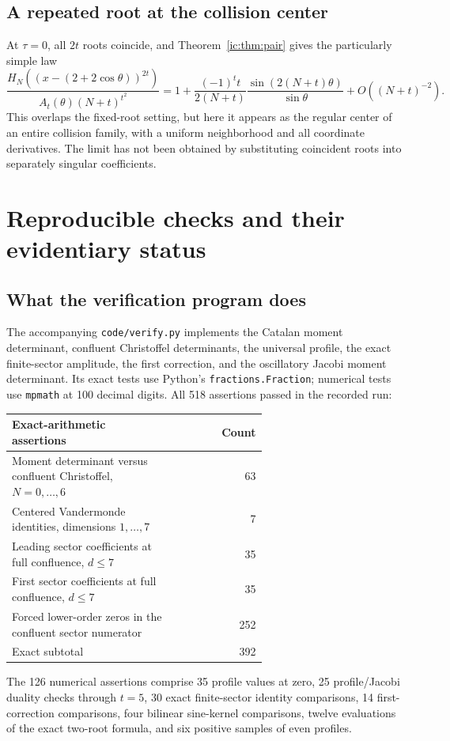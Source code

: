 \documentclass[11pt,a4paper]{article}
\numberwithin{equation}{section}
\theoremstyle{definition}
\theoremstyle{remark}
\begin{document}
\subsection{A repeated root at the collision center}
At $\tau=0$, all $2t$ roots coincide, and
Theorem~\ref{ic:thm:pair} gives the particularly simple law
\begin{equation}\label{ic:eq:centerlaw}
 \frac{H_N((x-(2+2\cos\theta))^{2t})}
      {A_t(\theta)(N+t)^{t^2}}
 =1+\frac{(-1)^t t}{2(N+t)}
       \frac{\sin(2(N+t)\theta)}{\sin\theta}
 +O((N+t)^{-2}).
\end{equation}
This overlaps the fixed-root setting, but here it appears as the regular
center of an entire collision family, with a uniform neighborhood and
all coordinate derivatives. The limit has not been obtained by
substituting coincident roots into separately singular coefficients.

\section{Reproducible checks and their evidentiary status}\label{ic:sec:checks}
\subsection{What the verification program does}
The accompanying \texttt{code/verify.py} implements the Catalan moment
determinant, confluent Christoffel determinants, the universal profile,
the exact finite-sector amplitude, the first correction, and the
oscillatory Jacobi moment determinant. Its exact tests use Python's
\texttt{fractions.Fraction}; numerical tests use \texttt{mpmath} at 100
decimal digits. All 518 assertions passed in the recorded run:
\begin{center}
\begin{tabular}{p{0.64\linewidth}r}
\toprule
Exact-arithmetic assertions & Count\\
\midrule
Moment determinant versus confluent Christoffel, $N=0,\ldots,6$ &63\\
Centered Vandermonde identities, dimensions $1,\ldots,7$ &7\\
Leading sector coefficients at full confluence, $d\le7$ &35\\
First sector coefficients at full confluence, $d\le7$ &35\\
Forced lower-order zeros in the confluent sector numerator &252\\
\midrule
Exact subtotal &392\\
\bottomrule
\end{tabular}
\end{center}
The 126 numerical assertions comprise 35 profile values at zero, 25
profile/Jacobi duality checks through $t=5$, 30 exact finite-sector
identity comparisons, 14 first-correction comparisons, four bilinear
sine-kernel comparisons, twelve evaluations of the exact two-root
formula, and six positive samples of even profiles.
\end{document}
